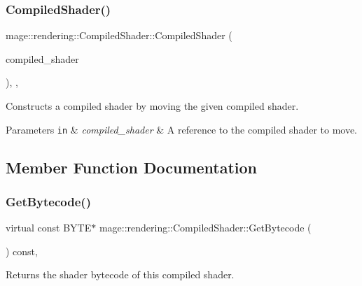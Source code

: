 \subsubsection{\texorpdfstring{Compiled\+Shader()}{CompiledShader()}\hspace{0.1cm}{\footnotesize\ttfamily [3/3]}}
{\footnotesize\ttfamily mage\+::rendering\+::\+Compiled\+Shader\+::\+Compiled\+Shader (\begin{DoxyParamCaption}\item[{\mbox{\hyperlink{classmage_1_1rendering_1_1_compiled_shader}{Compiled\+Shader}} \&\&}]{compiled\+\_\+shader }\end{DoxyParamCaption})\hspace{0.3cm}{\ttfamily [protected]}, {\ttfamily [default]}, {\ttfamily [noexcept]}}

Constructs a compiled shader by moving the given compiled shader.


\begin{DoxyParams}[1]{Parameters}
\mbox{\tt in}  & {\em compiled\+\_\+shader} & A reference to the compiled shader to move. \\
\hline
\end{DoxyParams}


\subsection{Member Function Documentation}
\mbox{\label{classmage_1_1rendering_1_1_compiled_shader_a6067250341f428be19ed2aa9955a10b6}} 
\subsubsection{\texorpdfstring{Get\+Bytecode()}{GetBytecode()}}
{\footnotesize\ttfamily virtual const B\+Y\+TE$\ast$ mage\+::rendering\+::\+Compiled\+Shader\+::\+Get\+Bytecode (\begin{DoxyParamCaption}{ }\end{DoxyParamCaption}) const\hspace{0.3cm}{\ttfamily [pure virtual]}, {\ttfamily [noexcept]}}

Returns the shader bytecode of this compiled shader.

